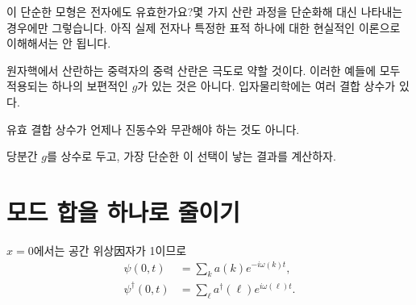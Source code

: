 \begin{classroomqa}
이 단순한 모형은 전자에도 유효한가요?\audiencequestion{}몇 가지 산란 과정을 단순화해 대신 나타내는 경우에만 그렇습니다. 아직 실제 전자나 특정한 표적 하나에 대한 현실적인 이론으로 이해해서는 안 됩니다.\lecturerresponse{}
\end{classroomqa}

원자핵에서 산란하는 중력자의 중력 산란은 극도로 약할 것이다. 이러한 예들에 모두 적용되는 하나의 보편적인 \(g\)가 있는 것은 아니다. 입자물리학에는 여러 결합 상수가 있다.

유효 결합 상수가 언제나 진동수와 무관해야 하는 것도 아니다.

\begin{classroomqa}
\end{classroomqa}

당분간 \(g\)를 상수로 두고, 가장 단순한 이 선택이 낳는 결과를 계산하자.

\begin{classroomqa}
\end{classroomqa}

\section{모드 합을 하나로 줄이기}

\(x=0\)에서는 공간 위상因자가 1이므로
\begin{align}
\psi(0,t)&=\sum_k a(k)e^{-i\omega(k)t},\\
\psi^\dagger(0,t)&=\sum_\ell a^\dagger(\ell)e^{i\omega(\ell)t}.
\end{align}

\begin{classroomqa}
\end{classroomqa}

